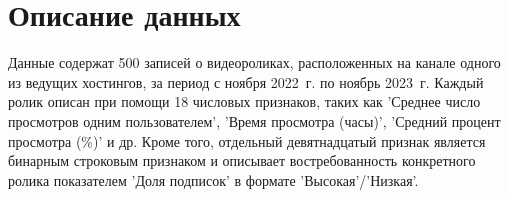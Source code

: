 
\section{Описание данных}
Данные содержат 500 записей о видеороликах, расположенных на канале одного из ведущих хостингов, за период с ноября 2022 г. по ноябрь 2023 г. Каждый ролик описан при помощи 18 числовых признаков, таких как 'Среднее число просмотров одним пользователем', 'Время просмотра (часы)', 'Средний процент просмотра (\%)' и др. Кроме того, отдельный девятнадцатый признак является бинарным строковым признаком и описывает востребованность конкретного ролика показателем 'Доля подписок' в формате 'Высокая'/'Низкая'. 

